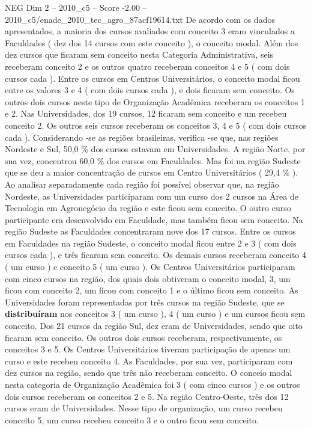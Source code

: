 \begin{textsample}{NEG Dim 2 – 2010\_c5 – Score -2.00 – 2010\_c5/enade\_2010\_tec\_agro\_87acf19614.txt}
De acordo com os dados apresentados, a maioria dos cursos avaliados com conceito 3 eram vinculados a Faculdades ( dez dos 14 cursos com este conceito ), o conceito modal.
Além dos dez cursos que ficaram sem conceito nesta Categoria Administrativa, seis receberam conceito 2 e os outros quatro receberam conceitos 4 e 5 ( com dois cursos cada ).
Entre os cursos em Centros Universitários, o conceito modal ficou entre os valores 3 e 4 ( com dois cursos cada ), e dois ficaram sem conceito.
Os outros dois cursos neste tipo de Organização Acadêmica receberam os conceitos 1 e 2.
Nas Universidades, dos 19 cursos, 12 ficaram sem conceito e um recebeu conceito 2.
Os outros seis cursos receberam os conceitos 3, 4 e 5 ( com dois cursos cada ).
Considerando -se as regiões brasileiras, verifica -se que, nas regiões Nordeste e Sul, 50,0 \% dos cursos estavam em Universidades.
A região Norte, por sua vez, concentrou 60,0 \% dos cursos em Faculdades.
Mas foi na região Sudeste que se deu a maior concentração de cursos em Centro Universitários ( 29,4 \% ).
Ao analisar separadamente cada região foi possível observar que, na região Nordeste, as Universidades participaram com um curso dos 2 cursos na Área de Tecnologia em Agronegócio da região e este ficou sem conceito.
O outro curso participante era desenvolvido em Faculdade, mas também ficou sem conceito.
Na região Sudeste as Faculdades concentraram nove dos 17 cursos.
Entre os cursos em Faculdades na região Sudeste, o conceito modal ficou entre 2 e 3 ( com dois cursos cada ), e três ficaram sem conceito.
Os demais cursos receberam conceito 4 ( um curso ) e conceito 5 ( um curso ).
Os Centros Universitários participaram com cinco cursos na região, dos quais dois obtiveram o conceito modal, 3, um ficou com conceito 2, um ficou com conceito 1 e o último ficou sem conceito.
As Universidades foram representadas por três cursos na região Sudeste, que se \textbf{distribuíram} nos conceitos 3 ( um curso ), 4 ( um curso ) e um cursos ficou sem conceito.
Dos 21 cursos da região Sul, dez eram de Universidades, sendo que oito ficaram sem conceito.
Os outros dois cursos receberam, respectivamente, os conceitos 3 e 5.
Os Centros Universitários tiveram participação de apenas um curso e este recebeu conceito 4.
As Faculdades, por sua vez, participaram com dez cursos na região, sendo que três não receberam conceito.
O conceio modal nesta categoria de Organização Acadêmica foi 3 ( com cinco cursos ) e os outros dois cursos receberam os conceitos 2 e 5.
Na região Centro-Oeste, três dos 12 cursos eram de Universidades.
Nesse tipo de organização, um curso recebeu conceito 5, um curso recebeu conceito 3 e o outro ficou sem conceito.

\end{textsample}
